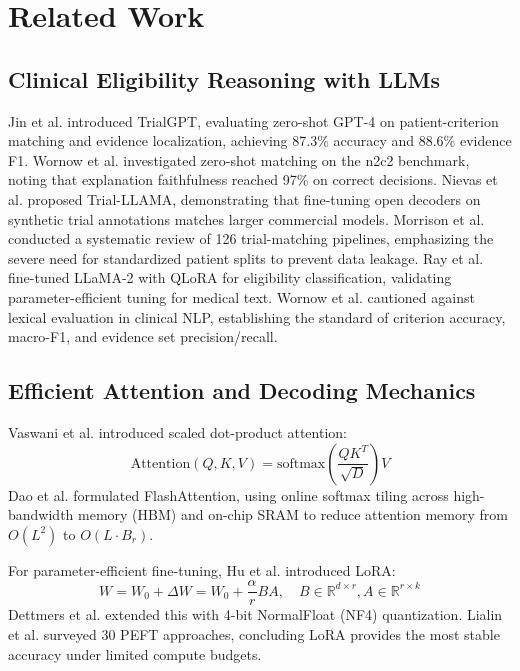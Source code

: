 \documentclass[conference]{IEEEtran}
\begin{document}
\section{Related Work}
\subsection{Clinical Eligibility Reasoning with LLMs}
Jin et al. \cite{jin2024matching} introduced TrialGPT, evaluating zero-shot GPT-4 on patient-criterion matching and evidence localization, achieving 87.3\% accuracy and 88.6\% evidence F1. Wornow et al. \cite{wornow2024zero} investigated zero-shot matching on the n2c2 benchmark, noting that explanation faithfulness reached 97\% on correct decisions. Nievas et al. \cite{nievas2024distilling} proposed Trial-LLAMA, demonstrating that fine-tuning open decoders on synthetic trial annotations matches larger commercial models. Morrison et al. \cite{morrison2025systematic} conducted a systematic review of 126 trial-matching pipelines, emphasizing the severe need for standardized patient splits to prevent data leakage. Ray et al. \cite{ray2025leveraging} fine-tuned LLaMA-2 with QLoRA for eligibility classification, validating parameter-efficient tuning for medical text. Wornow et al. \cite{wornow2023shaky} cautioned against lexical evaluation in clinical NLP, establishing the standard of criterion accuracy, macro-F1, and evidence set precision/recall.

\subsection{Efficient Attention and Decoding Mechanics}
Vaswani et al. \cite{vaswani2017attention} introduced scaled dot-product attention:
\begin{equation}
\text{Attention}(Q,K,V) = \text{softmax}\left(\frac{QK^T}{\sqrt{D}}\right)V
\end{equation}
Dao et al. \cite{dao2022flashattention, dao2023flashattention2} formulated FlashAttention, using online softmax tiling across high-bandwidth memory (HBM) and on-chip SRAM to reduce attention memory from $O(L^2)$ to $O(L \cdot B_r)$. 

For parameter-efficient fine-tuning, Hu et al. \cite{hu2022lora} introduced LoRA:
\begin{equation}
W = W_0 + \Delta W = W_0 + \frac{\alpha}{r}BA, \quad B \in \mathbb{R}^{d \times r}, A \in \mathbb{R}^{r \times k}
\end{equation}
Dettmers et al. \cite{dettmers2023qlora} extended this with 4-bit NormalFloat (NF4) quantization. Lialin et al. \cite{lialin2023scaling} surveyed 30 PEFT approaches, concluding LoRA provides the most stable accuracy under limited compute budgets.
\end{document}
